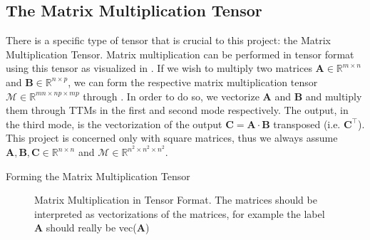 \subsection{The Matrix Multiplication Tensor} \label{sec:The Matrix Multiplication Tensor}

    There is a specific type of tensor that is crucial to this project: the
    Matrix Multiplication Tensor. Matrix multiplication can be performed in
    tensor format using this tensor as visualized in .
    If we wish to multiply two matrices $\mathbf{A} \in \mathbb{R}^{m\times n}$
    and $\mathbf{B}\in \mathbb{R}^{n\times p}$, we can form the respective
    matrix multiplication tensor $\mathcal{M}\in \mathbb{R}^{mn \times np\times
    mp}$ through . In order to do so, we vectorize
    $\mathbf{A}$ and $\mathbf{B}$ and multiply them through TTMs in the first
    and second mode respectively. The output, in the third mode, is the
    vectorization of the output $\mathbf{C} = \mathbf{A}\cdot \mathbf{B}$
    transposed (i.e. $\mathbf{C^\intercal}$). This project is concerned only
    with square matrices, thus we always assume $\mathbf{A}, \mathbf{B},
    \mathbf{C}\in \mathbb{R}^{n\times n}$ and
    $\mathcal{M}\in\mathbb{R}^{n^2\times n^2\times n^2}$.

    \begin{algorithm}
        \caption{Forming the Matrix Multiplication Tensor}
        \label{alg:matmul_tensor}
        \begin{algorithmic}[0]
                 
                        \EndFor
                    \EndFor
                \EndFor
            \EndFunction
        \end{algorithmic}
    \end{algorithm}

    \begin{figure}
        \centering
        
        \caption[Matrix Multiplication in Tensor Format]{Matrix Multiplication
        in Tensor Format. The matrices should be interpreted as vectorizations
        of the matrices, for example the label $\mathbf{A}$ should really be
        vec($\mathbf{A}$)}
        \label{fig:matmul_tensor}
    \end{figure}

